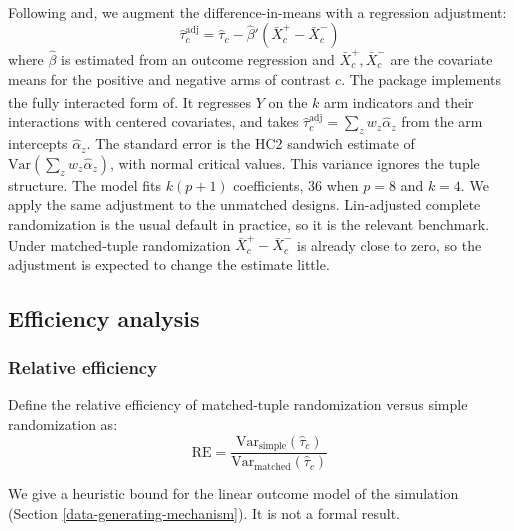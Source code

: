 \documentclass[
  11pt,
]{article}
\begin{document}
Following\textsuperscript{} and\textsuperscript{}, we augment the
difference-in-means with a regression adjustment:
\begin{equation}
  \hat{\tau}_c^{\text{adj}} = \hat{\tau}_c -
    \hat{\beta}'(\bar{X}_c^{+} - \bar{X}_c^{-})
\end{equation}
where \(\hat{\beta}\) is estimated from an outcome regression
and \(\bar{X}_c^{+}, \bar{X}_c^{-}\) are the covariate means
for the positive and negative arms of contrast \(c\). The
package implements the fully interacted form of\textsuperscript{}. It regresses \(Y\) on the \(k\) arm
indicators and their interactions with centered covariates,
and takes \(\hat\tau_c^{\text{adj}} = \sum_z w_z
\hat\alpha_z\) from the arm intercepts \(\hat\alpha_z\). The
standard error is the HC2 sandwich estimate of
\(\text{Var}(\sum_z w_z \hat\alpha_z)\), with normal critical
values. This variance ignores the tuple structure. The
model fits \(k(p+1)\) coefficients, 36 when \(p = 8\) and
\(k = 4\). We apply the same adjustment to the unmatched
designs. Lin-adjusted complete randomization is the usual
default in practice, so it is the relevant benchmark. Under
matched-tuple randomization \(\bar{X}_c^{+} - \bar{X}_c^{-}\)
is already close to zero, so the adjustment is expected to
change the estimate little.

\subsection{Efficiency analysis}\label{efficiency-analysis}

\subsubsection{Relative efficiency}\label{relative-efficiency}

Define the relative efficiency of matched-tuple randomization
versus simple randomization as:
\begin{equation}
  \text{RE} = \frac{\text{Var}_{\text{simple}}(\hat{\tau}_c)}
    {\text{Var}_{\text{matched}}(\hat{\tau}_c)}
\end{equation}

We give a heuristic bound for the linear outcome model of
the simulation (Section \ref{data-generating-mechanism}).
It is not a formal result.
\end{document}
